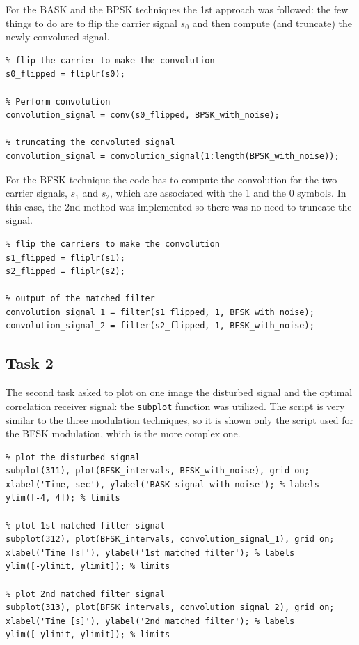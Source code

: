 For the BASK and the BPSK techniques the 1st approach was followed: the few things to do are to flip the carrier signal $s_0$ and then compute (and truncate) the newly convoluted signal.

\begin{lstlisting}
% flip the carrier to make the convolution
s0_flipped = fliplr(s0);

% Perform convolution
convolution_signal = conv(s0_flipped, BPSK_with_noise);

% truncating the convoluted signal
convolution_signal = convolution_signal(1:length(BPSK_with_noise));
\end{lstlisting}

\noindent For the BFSK technique the code has to compute the convolution for the two carrier signals, $s_1$ and $s_2$, which are associated with the 1 and the 0 symbols. In this case, the 2nd method was implemented so there was no need to truncate the signal.

\begin{lstlisting}
% flip the carriers to make the convolution
s1_flipped = fliplr(s1);
s2_flipped = fliplr(s2);

% output of the matched filter
convolution_signal_1 = filter(s1_flipped, 1, BFSK_with_noise);
convolution_signal_2 = filter(s2_flipped, 1, BFSK_with_noise);
\end{lstlisting}


\subsection*{Task 2}
The second task asked to plot on one image the disturbed signal and the optimal correlation receiver signal: the \texttt{subplot} function was utilized. The script is very similar to the three modulation techniques, so it is shown only the script used for the BFSK modulation, which is the more complex one.

\begin{lstlisting}
% plot the disturbed signal
subplot(311), plot(BFSK_intervals, BFSK_with_noise), grid on; 
xlabel('Time, sec'), ylabel('BASK signal with noise'); % labels
ylim([-4, 4]); % limits

% plot 1st matched filter signal
subplot(312), plot(BFSK_intervals, convolution_signal_1), grid on; 
xlabel('Time [s]'), ylabel('1st matched filter'); % labels
ylim([-ylimit, ylimit]); % limits

% plot 2nd matched filter signal
subplot(313), plot(BFSK_intervals, convolution_signal_2), grid on; 
xlabel('Time [s]'), ylabel('2nd matched filter'); % labels
ylim([-ylimit, ylimit]); % limits
\end{lstlisting}

